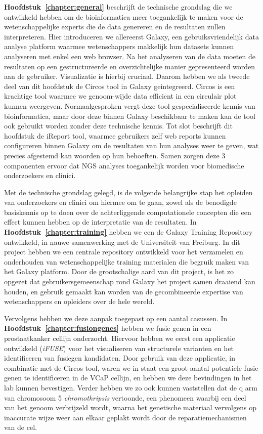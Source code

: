 \textbf{Hoofdstuk~\ref{chapter:general}} beschrijft de technische grondslag die we ontwikkeld hebben om de bioinformatica meer toegankelijk te maken voor de wetenschappelijke experts die de data genereren en de resultaten zullen interpreteren.
Hier introduceren we allereerst Galaxy, een gebruiksvriendelijk data analyse platform waarmee wetenschappers makkelijk hun datasets kunnen analyseren met enkel een web browser. Na het analyseren van de data moeten de resultaten op een gestructureerde en overzichtelijke manier gepresenteerd worden aan de gebruiker. Visualizatie is hierbij cruciaal.
Daarom hebben we als tweede deel van dit hoofdstuk de Circos tool in Galaxy geintegreerd. Circos is een krachtige tool waarmee we genoom-wijde data efficient in een circulair plot kunnen weergeven.
Normaalgesproken vergt deze tool gespecialiseerde kennis van bioinformatica, maar door deze binnen Galaxy beschikbaar te maken kan de tool ook gebruikt worden zonder deze technische kennis.
Tot slot beschrijft dit hoofdstuk de iReport tool, waarmee gebruikers zelf web reports kunnen configureren binnen Galaxy om de resultaten van hun analyses weer te geven, wat precies afgestemd kan woorden op hun behoeften.
Samen zorgen deze 3 componenten ervoor dat NGS analyses toegankelijk worden voor biomedische onderzoekers en clinici.

Met de technische grondslag gelegd, is de volgende belangrijke stap het opleiden van onderzoekers
en clinici om hiermee om te gaan, zowel als de benodigde basiskennis op te doen over de achterliggende computationele concepten die een effect kunnen hebben op de interpretatie van de resultaten.
In \textbf{Hoofdstuk~\ref{chapter:training}} hebben we een de Galaxy Training Repository ontwikkeld, in nauwe samenwerking met de Universiteit van Freiburg.
In dit project hebben we een centrale repository ontwikkeld voor het verzamelen en onderhouden van wetenschappelijke training materialen die begruik maken van het Galaxy platform.
Door de grootschalige aard van dit project, is het zo opgezet dat gebruikersgemeenschap rond Galaxy het project samen draaiend kan houden, en gebruik gemaakt kan worden van de gecombineerde expertise van wetenschappers en opleiders over de hele wereld.

Vervolgens hebben we deze aanpak toegepast op een aantal casussen. In \textbf{Hoofdstuk~\ref{chapter:fusiongenes}} hebben we fusie genen in een prostaatkanker cellijn onderzocht. Hiervoor hebben we eerst een applicatie ontwikkeld (\emph{iFUSE}) voor het visualiseren van structurele varianten en het identificeren van fusiegen kandidaten.
Door gebruik van deze applicatie, in combinatie met de Circos tool, waren we in staat een groot aantal potentiele fusie genen te identificeren in de VCaP cellijn, en hebben we deze bevindingen in het lab kunnen bevestigen.
Verder hebben we zo ook kunnen vaststellen dat de q arm van chromosoom 5 \emph{chromothripsis} vertoonde, een phenomeen waarbij een deel van het genoom verbrijzeld wordt, waarna het genetische materiaal vervolgens op inaccurate wijze weer aan elkaar geplakt wordt door de reparatiemechanismen van de cel.

